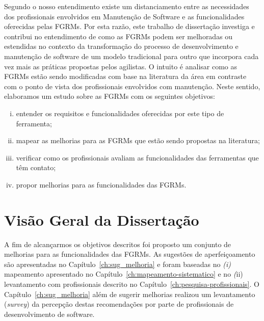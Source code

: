 Segundo o nosso entendimento existe um distanciamento entre as necessidades dos
profissionais envolvidos em Manutenção de Software e as funcionalidades
oferecidas pelas FGRMs\@. Por esta razão, este trabalho de dissertação investiga
e contribui no entendimento de como as FGRMs podem ser melhoradas ou estendidas
no contexto da transformação do processo de desenvolvimento e manutenção de
software de um modelo tradicional para outro que incorpora cada vez mais as
práticas propostas pelos agilistas. O intuito é analisar como as FGRMs estão
sendo modificadas com base na literatura da área em contraste com o ponto de
vista dos profissionais envolvidos com manutenção. Neste sentido, elaboramos um
estudo sobre as FGRMs com os seguintes objetivos:

\begin{enumerate}[(i)]
	\item entender os requisitos e funcionalidades oferecidas por este tipo de
        ferramenta;
	\item mapear as melhorias para as FGRMs que estão sendo propostas na
		literatura;
    \item verificar como os profissionais avaliam as funcionalidades das
        ferramentas que têm contato;
	\item propor melhorias para as funcionalidades das FGRMs\@.
\end{enumerate}


\section{Visão Geral da Dissertação}
\label{sec:intro-visao-geral}

A fim de alcançarmos os objetivos descritos foi proposto um conjunto de
melhorias para as funcionalidades das FGRMs. As sugestões de aperfeiçoamento
são apresentadas no Capítulo~\ref{ch:sug_melhoria} e foram baseadas no
\textit{(i)} mapeamento apresentado no Capítulo~\ref{ch:mapeamento-sistematico}
e no \textit(ii) levantamento com profissionais descrito no
Capítulo~\ref{ch:pesquisa-profissionais}. O Capítulo~\ref{ch:sug_melhoria} além
de sugerir melhorias realizou um levantamento (\textit{survey}) da percepção
destas recomendações por parte de profissionais de desenvolvimento de software.

